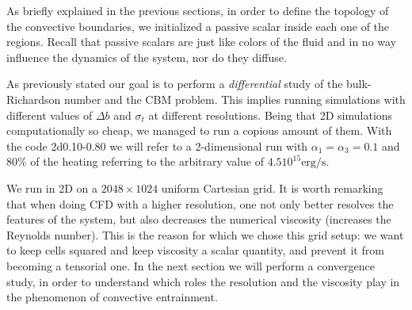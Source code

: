 As briefly explained in the previous sections, in order to define the topology of the convective boundaries, we initialized a passive scalar inside each one of the regions. Recall that passive scalars are just like colors of the fluid and in no way influence the dynamics of the system, nor do they diffuse.

As previously stated our goal is to perform a \textit{differential} study of the bulk-Richardson number and the CBM problem. This implies running simulations with different values of $\Delta b$ and $\sigma_t$ at different resolutions. Being that 2D simulations computationally so cheap, we managed to run a copious amount of them. With the code 2d0.10-0.80 we will refer to a 2-dimensional run with $\alpha_{1} = \alpha_{3}=0.1$ and $80 \%$ of the heating referring to the arbitrary value of $4.5 10^{15} \mathrm{erg/s}$.

We run in 2D on a $2048 \times 1024$ uniform Cartesian grid. It is worth remarking that when doing CFD with a higher resolution, one not only better resolves the features of the system, but also decreases the numerical viscosity (increases the Reynolds number). This is the reason for which we chose this grid setup: we want to keep cells squared and keep viscosity a scalar quantity, and prevent it from becoming a tensorial one. In the next section we will perform a convergence study, in order to understand which roles the resolution and the viscosity play in the phenomenon of convective entrainment.


